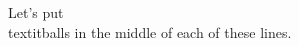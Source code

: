 \documentclass[preview]{standalone}
\begin{document}
\begin{center}
Let's put \\textit{balls} in the middle of each of these lines.
\end{center}
\end{document}
